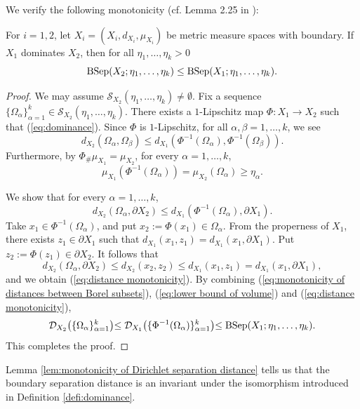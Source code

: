 We verify the following monotonicity (cf. Lemma 2.25 in \cite{Sh}):
\begin{lem}\label{lem:monotonicity of Dirichlet separation distance}
For $i=1,2$,
let $X_{i}=(X_{i},d_{X_{i}},\mu_{X_{i}})$ be metric measure spaces with boundary.
If $X_{1}$ dominates $X_{2}$,
then for all $\eta_{1},\dots,\eta_{k}>0$
\begin{equation*}
\operatorname{BSep}(X_{2};\eta_{1},\dots,\eta_{k})\leq \operatorname{BSep}(X_{1};\eta_{1},\dots,\eta_{k}).
\end{equation*}
\end{lem}
\begin{proof}
We may assume $\mathcal{S}_{X_{2}}(\eta_{1},\dots,\eta_{k})\neq \emptyset$.
Fix a sequence $\{\Omega_{\alpha}\}^{k}_{\alpha=1} \in \mathcal{S}_{X_{2}}(\eta_{1},\dots,\eta_{k})$.
There exists a $1$-Lipschitz map $\Phi:X_{1}\to X_{2}$ such that (\ref{eq:dominance}).
Since $\Phi$ is $1$-Lipschitz,
for all $\alpha,\beta=1,\dots,k$,
we see
\begin{equation}\label{eq:monotonicity of distances between Borel subsets}
d_{X_{2}}(\Omega_{\alpha},\Omega_{\beta})\leq d_{X_{1}}(\Phi^{-1}(\Omega_{\alpha}),\Phi^{-1}(\Omega_{\beta})).
\end{equation}
Furthermore,
by $\Phi_{\#}\mu_{X_{1}}=\mu_{X_{2}}$,
for every $\alpha=1,\dots,k$,
\begin{equation}\label{eq:lower bound of volume}
\mu_{X_{1}}(\Phi^{-1}(\Omega_{\alpha}))=\mu_{X_{2}}(\Omega_{\alpha}) \geq \eta_{\alpha}.
\end{equation}

We show that
for every $\alpha=1,\dots,k$,
\begin{equation}\label{eq:distance monotonicity}
d_{X_{2}}(\Omega_{\alpha},\partial X_{2})\leq d_{X_{1}}(\Phi^{-1}(\Omega_{\alpha}),\partial X_{1}).
\end{equation}
Take $x_{1} \in \Phi^{-1}(\Omega_{\alpha})$,
and put $x_{2}:=\Phi(x_{1})\in \Omega_{\alpha}$.
From the properness of $X_{1}$,
there exists $z_{1} \in \partial X_{1}$ such that $d_{X_{1}}(x_{1},z_{1})=d_{X_{1}}(x_{1},\partial X_{1})$.
Put $z_{2}:=\Phi(z_{1})\in \partial X_{2}$.
It follows that
\begin{equation*}
d_{X_{2}}(\Omega_{\alpha},\partial X_{2})\leq d_{X_{2}}(x_{2},z_{2})\leq d_{X_{1}}(x_{1},z_{1})=d_{X_{1}}(x_{1},\partial X_{1}),
\end{equation*}
and
we obtain (\ref{eq:distance monotonicity}).
By combining (\ref{eq:monotonicity of distances between Borel subsets}), (\ref{eq:lower bound of volume}) and (\ref{eq:distance monotonicity}),
\begin{equation*}
\mathcal{D}_{X_{2}}\bigl(\{\Omega_{\alpha}\}^{k}_{\alpha=1}\bigl) \leq \mathcal{D}_{X_{1}}\bigl(\{   \Phi^{-1}(\Omega_{\alpha})   \}^{k}_{\alpha=1}\bigl) \leq \operatorname{BSep}(X_{1};\eta_{1},\dots,\eta_{k}).
\end{equation*}
This completes the proof.
\end{proof}
Lemma \ref{lem:monotonicity of Dirichlet separation distance} tells us that
the boundary separation distance is an invariant under the isomorphism introduced in Definition \ref{defi:dominance}.

